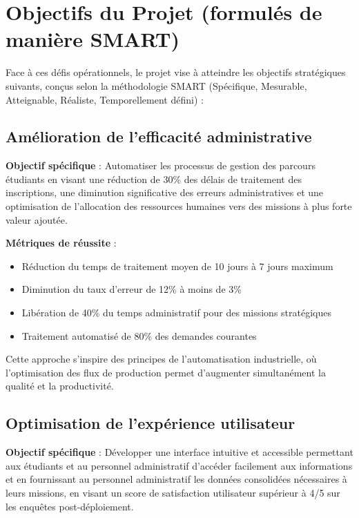 \documentclass[12pt,a4paper]{report}
\begin{document}
\section{Objectifs du Projet (formulés de manière SMART)}

Face à ces défis opérationnels, le projet vise à atteindre les objectifs stratégiques suivants, conçus selon la méthodologie SMART (Spécifique, Mesurable, Atteignable, Réaliste, Temporellement défini) :

\subsection{Amélioration de l'efficacité administrative}

\textbf{Objectif spécifique} : Automatiser les processus de gestion des parcours étudiants en visant une réduction de 30\% des délais de traitement des inscriptions, une diminution significative des erreurs administratives et une optimisation de l'allocation des ressources humaines vers des missions à plus forte valeur ajoutée.

\textbf{Métriques de réussite} :
\begin{itemize}
    \item Réduction du temps de traitement moyen de 10 jours à 7 jours maximum
    \item Diminution du taux d'erreur de 12\% à moins de 3\%
    \item Libération de 40\% du temps administratif pour des missions stratégiques
    \item Traitement automatisé de 80\% des demandes courantes
\end{itemize}

Cette approche s'inspire des principes de l'automatisation industrielle, où l'optimisation des flux de production permet d'augmenter simultanément la qualité et la productivité.

\subsection{Optimisation de l'expérience utilisateur}

\textbf{Objectif spécifique} : Développer une interface intuitive et accessible permettant aux étudiants et au personnel administratif d'accéder facilement aux informations et en fournissant au personnel administratif les données consolidées nécessaires à leurs missions, en visant un score de satisfaction utilisateur supérieur à 4/5 sur les enquêtes post-déploiement.
\end{document}
